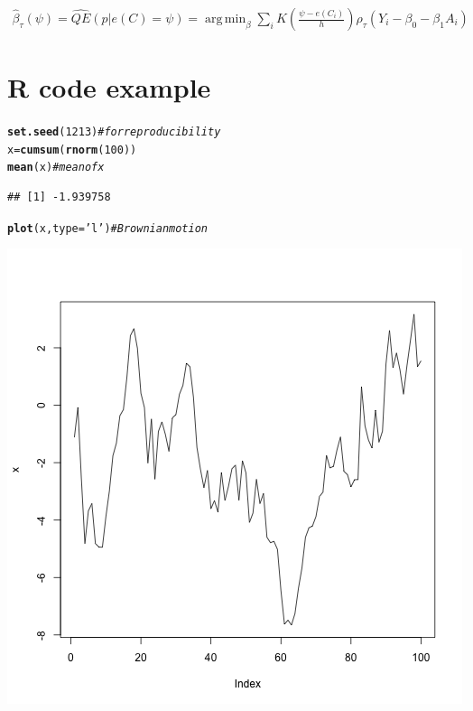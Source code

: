 \documentclass{article}\usepackage[]{graphicx}\usepackage[]{color}
\makeatletter
\def\maxwidth{ %
  \ifdim\Gin@nat@width>\linewidth
    \linewidth
  \else
    \Gin@nat@width
  \fi
}
\newcommand{\hlnum}[1]{\textcolor[rgb]{0.686,0.059,0.569}{#1}}%
\newcommand{\hlstr}[1]{\textcolor[rgb]{0.192,0.494,0.8}{#1}}%
\newcommand{\hlcom}[1]{\textcolor[rgb]{0.678,0.584,0.686}{\textit{#1}}}%
\newcommand{\hlstd}[1]{\textcolor[rgb]{0.345,0.345,0.345}{#1}}%
\newcommand{\hlkwb}[1]{\textcolor[rgb]{0.69,0.353,0.396}{#1}}%
\newcommand{\hlkwc}[1]{\textcolor[rgb]{0.333,0.667,0.333}{#1}}%
\newcommand{\hlkwd}[1]{\textcolor[rgb]{0.737,0.353,0.396}{\textbf{#1}}}%
\newenvironment{kframe}{%
 \def\at@end@of@kframe{}%
 \ifinner\ifhmode%
  \def\at@end@of@kframe{\end{minipage}}%
  \begin{minipage}{\columnwidth}%
 \fi\fi%
 \def\FrameCommand##1{\hskip\@totalleftmargin \hskip-\fboxsep
 \colorbox{shadecolor}{##1}\hskip-\fboxsep
     \hskip-\linewidth \hskip-\@totalleftmargin \hskip\columnwidth}%
 \MakeFramed {\advance\hsize-\width
   \@totalleftmargin\z@ \linewidth\hsize
   \@setminipage}}%
 {\par\unskip\endMakeFramed%
 \at@end@of@kframe}
\newenvironment{knitrout}{}{} %
\DeclareMathOperator*{\argmin}{arg\,min}
\def\betahat{{\widehat\beta}}
\makeatother
\begin{document}
\begin{align*}
  \betahat_\tau(\psi) = \widehat{QE}(p|e(C)=\psi) = \argmin_\beta \sum_i K( \frac{\psi-e(C_i)}{h}) \rho_\tau( Y_i - \beta_0 - \beta_1 A_i)
\end{align*}

\section{R code example}
\begin{knitrout}
\color{fgcolor}\begin{kframe}
\begin{alltt}
\hlkwd{set.seed}\hlstd{(}\hlnum{1213}\hlstd{)}  \hlcom{# for reproducibility}
\hlstd{x} \hlkwb{=} \hlkwd{cumsum}\hlstd{(}\hlkwd{rnorm}\hlstd{(}\hlnum{100}\hlstd{))}
\hlkwd{mean}\hlstd{(x)}  \hlcom{# mean of x}
\end{alltt}
\begin{verbatim}
## [1] -1.939758
\end{verbatim}
\begin{alltt}
\hlkwd{plot}\hlstd{(x,} \hlkwc{type} \hlstd{=} \hlstr{'l'}\hlstd{)}  \hlcom{# Brownian motion}
\end{alltt}
\end{kframe}
\includegraphics[width=\maxwidth]{figure/my-label-1} 

\end{knitrout}
\end{document}
